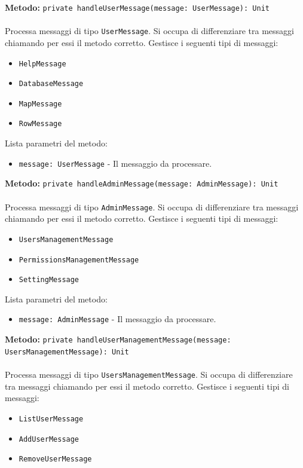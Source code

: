\documentclass[a4paper]{article}
\begin{document}
		\textbf{Metodo: }\texttt{private handleUserMessage(message: UserMessage): Unit}
			\\ \\
			Processa messaggi di tipo \texttt{UserMessage}. Si occupa di differenziare tra messaggi chiamando per essi il metodo corretto.
			Gestisce i seguenti tipi di messaggi:
			\begin{itemize}
				\item \texttt{HelpMessage}
				\item \texttt{DatabaseMessage}
				\item \texttt{MapMessage}
				\item \texttt{RowMessage}
			\end{itemize}
			Lista parametri del metodo:
			\begin{itemize}
				\item \texttt{message: UserMessage} - Il messaggio da processare.
			\end{itemize}
		\textbf{Metodo: }\texttt{private handleAdminMessage(message: AdminMessage): Unit}
			\\ \\
			Processa messaggi di tipo \texttt{AdminMessage}. Si occupa di differenziare tra messaggi chiamando per essi il metodo corretto.
			Gestisce i seguenti tipi di messaggi:
			\begin{itemize}
				\item \texttt{UsersManagementMessage}
				\item \texttt{PermissionsManagementMessage}
				\item \texttt{SettingMessage}
			\end{itemize}
			Lista parametri del metodo:
			\begin{itemize}
				\item \texttt{message: AdminMessage} - Il messaggio da processare.
			\end{itemize}
		\textbf{Metodo: }\texttt{private handleUserManagementMessage(message: UsersManagementMessage): Unit}
			\\ \\
			Processa messaggi di tipo \texttt{UsersManagementMessage}. Si occupa di differenziare tra messaggi chiamando per essi il metodo corretto.
			Gestisce i seguenti tipi di messaggi:
			\begin{itemize}
				\item \texttt{ListUserMessage}
				\item \texttt{AddUserMessage}
				\item \texttt{RemoveUserMessage}
			\end{itemize}
\end{document}
